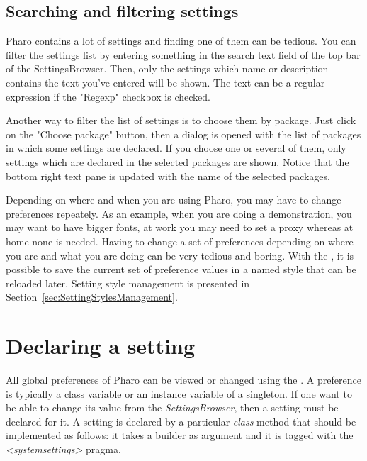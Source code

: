 \documentclass[a4paper,10pt,twoside]{book}
\begin{document}
\subsection{Searching and filtering settings}
Pharo contains a lot of settings and finding one of them can be tedious. 
You can filter the settings list by entering something in the search text field of the top bar of the SettingsBrowser. Then, only the settings which name or description contains the text you've entered will be shown. The text can be a regular expression if the "Regexp" checkbox is checked.

Another way to filter the list of settings is to choose them by package. Just click on the "Choose package" button, then a dialog is opened with the list of packages in which some settings are declared. If you choose one or several of them, only settings which are declared in the selected packages are shown. Notice that the bottom right text pane is updated with the name of the selected packages.

Depending on where and when you are using Pharo, you may have to change preferences repeately. As an example, when you are doing a demonstration, you may want to have bigger fonts, at work you may need to set a proxy whereas at home none is needed. Having to change a set of preferences depending on where you are and what you are doing can be very tedious and boring. With the \setbrowser, it is possible to save the current set of preference values in a named style that can be reloaded later. Setting style management is presented in Section~\ref{sec:SettingStylesManagement}.

\section{Declaring a setting}
\label{sec:DeclaringASetting}

All global preferences of Pharo can be viewed or changed using the \setbrowser. A preference is typically a class variable or an instance variable of a singleton. If one want to be able to change its value from the \textit{SettingsBrowser}, then a setting must be declared for it.
A setting is declared by a particular \emph{class} method that should be  implemented as follows: it takes a builder as argument and it is tagged with the \textit{<systemsettings>} pragma. 
\end{document}
